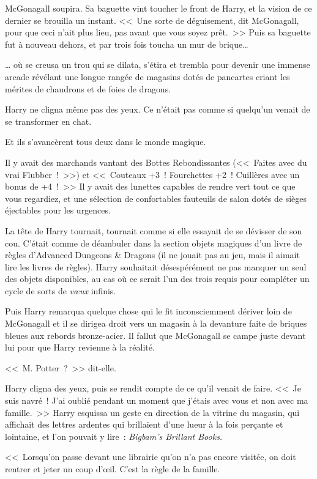 McGonagall soupira. Sa baguette vint toucher le front de Harry, et la vision de ce dernier se brouilla un instant. <<~Une sorte de déguisement, dit McGonagall, pour que ceci n'ait plus lieu, pas avant que vous soyez prêt.~>> Puis sa baguette fut à nouveau dehors, et par trois fois toucha un mur de brique…

… où se creusa un trou qui se dilata, s'étira et trembla pour devenir une immense arcade révélant une longue rangée de magasins dotés de pancartes criant les mérites de chaudrons et de foies de dragons.

Harry ne cligna même pas des yeux. Ce n'était pas comme si quelqu'un venait de se transformer en chat.

Et ils s'avancèrent tous deux dans le monde magique.

Il y avait des marchands vantant des Bottes Rebondissantes (<<~Faites avec du vrai Flubber~!~>>) et <<~Couteaux +3~! Fourchettes +2~! Cuillères avec un bonus de +4~!~>> Il y avait des lunettes capables de rendre vert tout ce que vous regardiez, et une sélection de confortables fauteuils de salon dotés de sièges éjectables pour les urgences.

La tête de Harry tournait, tournait comme si elle essayait de se dévisser de son cou. C'était comme de déambuler dans la section objets magiques d'un livre de règles d'Advanced Dungeons \& Dragons (il ne jouait pas au jeu, mais il aimait lire les livres de règles). Harry souhaitait désespérément ne pas manquer un seul des objets disponibles, au cas où ce serait l'un des trois requis pour compléter un cycle de sorts de \emph{vœux} infinis.

Puis Harry remarqua quelque chose qui le fit inconsciemment dériver loin de McGonagall et il se dirigea droit vers un magasin à la devanture faite de briques bleues aux rebords bronze-acier. Il fallut que McGonagall se campe juste devant lui pour que Harry revienne à la réalité.

<<~M. Potter~?~>> dit-elle.

Harry cligna des yeux, puis se rendit compte de ce qu'il venait de faire. <<~Je suis navré~! J'ai oublié pendant un moment que j'étais avec vous et non avec ma famille.~>> Harry esquissa un geste en direction de la vitrine du magasin, qui affichait des lettres ardentes qui brillaient d'une lueur à la fois perçante et lointaine, et l'on pouvait y lire~: \emph{Bigbam's Brillant Books.}

<<~Lorsqu'on passe devant une librairie qu'on n'a pas encore visitée, on doit rentrer et jeter un coup d'œil. C'est la règle de la famille.

